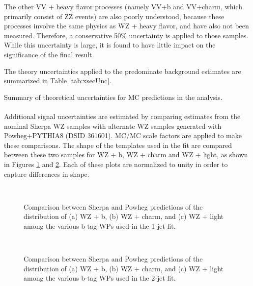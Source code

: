 The other VV + heavy flavor processes (namely VV+b and VV+charm, which primarily consist of ZZ events) are also poorly understood, because these processes involve the same physics as WZ + heavy flavor, and have also not been measured. Therefore, a conservative 50\% uncertainty is applied to those samples. While this uncertainty is large, it is found to have little impact on the significance of the final result.

The theory uncertainties applied to the predominate background estimates are summarized in Table \ref{tab:xsecUnc}. 

\begin{table}[H]
{\footnotesize
\centering

\caption{Summary of theoretical uncertainties for MC predictions in the analysis.}
\label{tab:xsecUnc}
}
\end{table}

\paragraph{}
Additional signal uncertainties are estimated by comparing estimates from the nominal Sherpa WZ samples with alternate WZ samples generated with Powheg+PYTHIA8 (DSID 361601). MC/MC scale factors are applied to make these comparisons. The shape of the templates used in the fit are compared between these two samples for WZ + b, WZ + charm and WZ + light, as shown in Figures \ref{fig:powheg1j} and \ref{fig:powheg2j}. Each of these plots are normalized to unity in order to capture differences in shape. 

\begin{figure}[H]
    \centering
    \\
    \caption{Comparison between Sherpa and Powheg predictions of the distribution of (a) WZ + b, (b) WZ + charm, and (c) WZ + light among the various b-tag WPs used in the 1-jet fit.}
\label{fig:powheg1j}
\end{figure}

\begin{figure}[H]
    \centering
    \\
    \caption{Comparison between Sherpa and Powheg predictions of the distribution of (a) WZ + b, (b) WZ + charm, and (c) WZ + light among the various b-tag WPs used in the 2-jet fit.}
\label{fig:powheg2j}
\end{figure}

